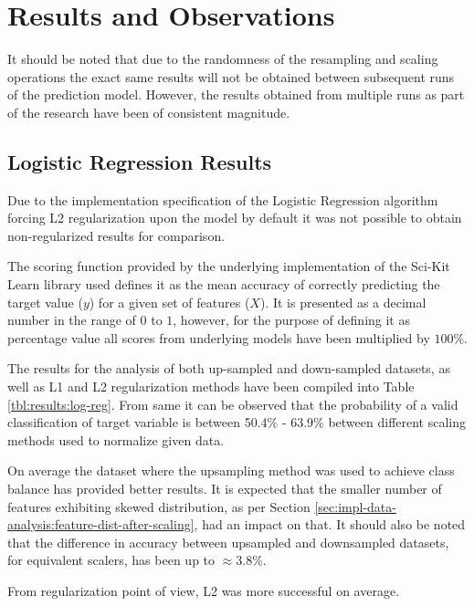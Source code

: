 \chapter{Results and Observations}\label{chp:results-and-observations}
It should be noted that due to the randomness of the resampling and scaling operations the exact same results will not be obtained between subsequent runs of the prediction model. However, the results obtained from multiple runs as part of the research have been of consistent magnitude.
\section{Logistic Regression Results}\label{sec:results:log-reg}

Due to the implementation specification of the Logistic Regression algorithm forcing L2 regularization upon the model by default it was not possible to obtain non-regularized results for comparison.

The scoring function provided by the underlying implementation of the Sci-Kit Learn library used defines it as the mean accuracy of correctly predicting the target value ($y$) for a given set of features ($X$). It is presented as a decimal number in the range of $ 0$ to $1$, however, for the purpose of defining it as percentage value all scores from underlying models have been multiplied by $100\%$.

The results for the analysis of both up-sampled and down-sampled datasets, as well as L1 and L2 regularization methods have been compiled into Table \ref{tbl:results:log-reg}. From same it can be observed that the probability of a valid classification of \isBug{} target variable is between 50.4\% - 63.9\% between different scaling methods used to normalize given data.

On average the dataset where the upsampling method was used to achieve class balance has provided better results. It is expected that the smaller number of features exhibiting skewed distribution, as per Section \ref{sec:impl-data-analysis:feature-dist-after-scaling}, had an impact on that. It should also be noted that the difference in accuracy between upsampled and downsampled datasets, for equivalent scalers, has been up to $\approx 3.8\%$.

From regularization point of view, L2 was more successful on average.

